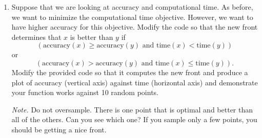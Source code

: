 \documentclass[11pt]{article}
\begin{document}
\begin{enumerate}[label=\textbf{(\alph*)}, leftmargin=1.2cm]
		Applying these in sequence:
		\begin{align*}
			&\neg \bigl(\exists y \, \exists j \, \forall i \ne j \;
			[ f_j(x) > f_j(y) \text{ and } f_i(y) \le f_i(x) ] \bigr) \\
			&= \forall y \; \neg \bigl(\exists j \, \forall i \ne j \;
			[ f_j(x) > f_j(y) \text{ and } f_i(y) \le f_i(x) ] \bigr) \\
			&= \forall y \; \forall j \;
			\neg \bigl(\forall i \ne j \;
			[ f_j(x) > f_j(y) \text{ and } f_i(y) \le f_i(x) ] \bigr) \\
			&= \forall y \; \forall j \;
			\exists i \ne j \; \neg \bigl( f_j(x) > f_j(y)
			\text{ and } f_i(y) \le f_i(x) \bigr) \\
			&= \forall y \; \forall j \;
			\exists i \ne j \; \bigl(
			f_j(x) \le f_j(y) \; \text{or} \;
			f_i(y) > f_i(x)
			\bigr).
		\end{align*}
		
		Therefore, we can express Pareto optimality equivalently as:
		\[
		\boxed{
			x \text{ is Pareto-optimal} \;\Longrightarrow\;
			\forall y \; \forall j \; \exists i \ne j :
			\bigl( f_j(x) \le f_j(y) \;\text{or}\;
			f_i(y) > f_i(x) \bigr).
		}
		\]
		
		In words, this means that for every other point $y$ and every objective $j$,
		there is at least one objective (possibly a different one) where either
		$x$ performs no worse than $y$, or $y$ performs worse than $x$.
		Thus, no point $y$ exists that is at least as good as $x$ in all objectives
		and strictly better in one.
		
		\item Suppose that we are looking at accuracy and computational time. As before, we want to minimize the computational time objective. However, we want to have higher accuracy for this objective. Modify the code so that the new front determines that $x$ is better than $y$ if
		\[
		(\text{accuracy}(x) \ge \text{accuracy}(y) \text{ and } \text{time}(x) < \text{time}(y))
		\]
		or
		\[
		(\text{accuracy}(x) > \text{accuracy}(y) \text{ and } \text{time}(x) \le \text{time}(y)).
		\]
		Modify the provided code so that it computes the new front and produce a plot of accuracy (vertical axis) against time (horizontal axis) and demonstrate your function works against 10 random points.
		
		\noindent\textit{Note.} Do not oversample. There is one point that is optimal and better than all of the others. Can you see which one? If you sample only a few points, you should be getting a nice front.
		

\end{enumerate}
\end{document}
